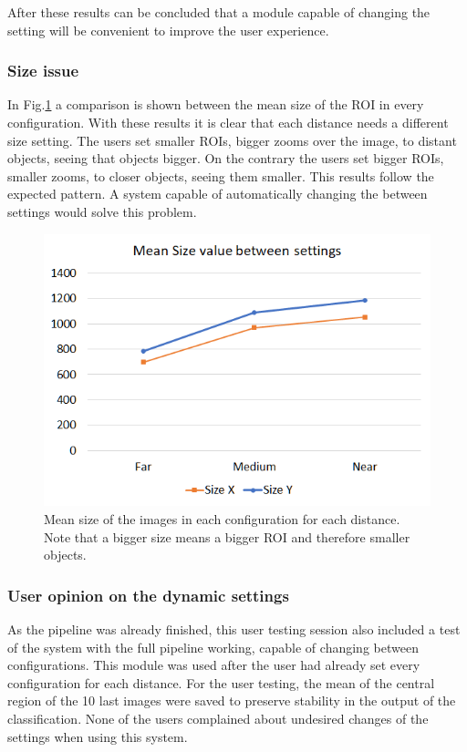 \documentclass[10pt,a4paper,twocolumn,twoside]{article}
\begin{document}
	After these results can be concluded that a module capable of changing the setting will be convenient to improve the user experience. 
	

	
	\subsubsection{Size issue}
	
	In Fig.\ref{fig:ut:2:size} a comparison is shown between the mean size of the ROI in every configuration. With these results it is clear that each distance needs a different size setting.  The users set smaller ROIs, bigger zooms over the image, to distant objects, seeing that objects bigger. On the contrary the users set bigger ROIs, smaller zooms, to closer objects, seeing them smaller. This results follow the expected pattern. A system capable of automatically changing the between settings would solve this problem. 
	
	\begin{figure}
		\centering
		\includegraphics[width=1\linewidth]{img/userTestingSizechart.png}
		\caption{Mean size of the images in each configuration for each distance. Note that a bigger size means a bigger ROI and therefore smaller objects.}
		\label{fig:ut:2:size}
	\end{figure}
	
	\subsubsection{User opinion on the dynamic settings}
	As the pipeline was already finished, this user testing session also included a test of the system with the full pipeline working, capable of changing between configurations. This module was used after the user had already set every configuration for each distance.  
	For the user testing, the mean of the central region of the 10 last images were saved to preserve stability in the output of the classification. None of the users complained about undesired changes of the settings when using this system.  
	
\end{document}
